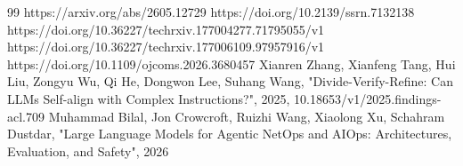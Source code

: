 \documentclass[conference]{IEEEtran}
\begin{document}
\begin{thebibliography}{99}
 https://arxiv.org/abs/2605.12729
 https://doi.org/10.2139/ssrn.7132138
 https://doi.org/10.36227/techrxiv.177004277.71795055/v1
 https://doi.org/10.36227/techrxiv.177006109.97957916/v1
 https://doi.org/10.1109/ojcoms.2026.3680457
 Xianren Zhang, Xianfeng Tang, Hui Liu, Zongyu Wu, Qi He, Dongwon Lee, Suhang Wang, "Divide-Verify-Refine: Can LLMs Self-align with Complex Instructions?", 2025, 10.18653/v1/2025.findings-acl.709
 Muhammad Bilal, Jon Crowcroft, Ruizhi Wang, Xiaolong Xu, Schahram Dustdar, "Large Language Models for Agentic NetOps and AIOps: Architectures, Evaluation, and Safety", 2026
\end{thebibliography}
\end{document}
